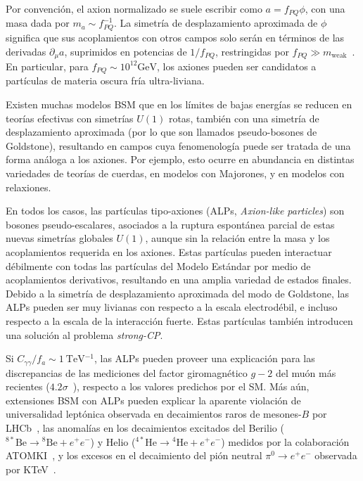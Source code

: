 Por convención, el axion normalizado se suele escribir como $a = f_{PQ} \phi$, con una masa dada por $m_a \sim f_{PQ}^{-1}$. La simetría de desplazamiento aproximada de $\phi$ significa que sus acoplamientos con otros campos solo serán en términos de las derivadas $\partial_\mu a$, suprimidos en potencias de $1/f_{PQ}$, restringidas por $f_{PQ} \gg m_{\text{weak}}$~\cite{Powell2016}. En particular, para $f_{PQ} \sim 10^{12} \si{\GeV}$, los axiones pueden ser candidatos a partículas de materia oscura fría ultra-liviana.

Existen muchas modelos BSM que en los límites de bajas energías se reducen en teorías efectivas con simetrías $U(1)$ rotas, también con una simetría de desplazamiento aproximada (por lo que son llamados pseudo-bosones de Goldstone), resultando en campos cuya fenomenología puede ser tratada de una forma análoga a los axiones. Por ejemplo, esto ocurre en abundancia en distintas variedades de teorías de cuerdas, en modelos con Majorones, y en modelos con relaxiones.

En todos los casos, las partículas tipo-axiones (ALPs, \textit{Axion-like particles}) son bosones pseudo-escalares, asociados a la ruptura espontánea parcial de estas nuevas simetrías globales $U(1)$, aunque sin la relación entre la masa y los acoplamientos requerida en los axiones. Estas partículas pueden interactuar débilmente con todas las partículas del Modelo Estándar por medio de acoplamientos derivativos, resultando en una amplia variedad de estados finales. Debido a la simetría de desplazamiento aproximada del modo de Goldstone, las ALPs pueden ser muy livianas con respecto a la escala electrodébil, e incluso respecto a la escala de la interacción fuerte. Estas partículas también introducen una solución al problema \textit{strong-CP}. 

Si $C_{\gamma\gamma}/f_a \sim \SI{1}{\TeV^{-1}}$, las ALPs pueden proveer una explicación para las discrepancias de las mediciones del factor giromagnético $g-2$ del muón más recientes ($4.2\sigma$~\cite[-9.1em][]{TheMuong-2Collaboration2021}), respecto a los valores predichos por el SM. Más aún, extensiones BSM con ALPs pueden explicar la aparente violación de universalidad leptónica observada en decaimientos raros de mesones-$B$ por LHCb~\cites[-9.2em][]{TheLHCbcollaboration2017}[-5.4em][]{TheLHCbCollaboration2019}[-][]{TheLHCbCollaboration2021}, las anomalías en los decaimientos excitados del Berilio (${}^{8*}\text{Be} \to {}^8\text{Be} + e^+ e^-$) y Helio (${}^{4*}\text{He} \to {}^4\text{He} + e^+ e^-$) medidos por la colaboración ATOMKI~\cites[-4.3em][]{Krasznahorkay2018}[-2.7em][]{Krasznahorkay:2019lyl}, y los excesos en el decaimiento del pión neutral $\pi^0 \to e^+ e^-$ observada por KTeV~\cite{Abouzaid2007}.


